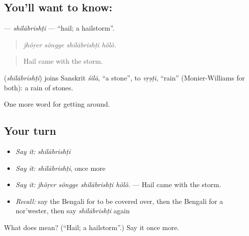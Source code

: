 \subsection*{You'll want to know: }
\textbf{} — \emph{shilābrishṭi} — \textquotedblleft{}hail; a hailstorm\textquotedblright{}.

\begin{quote}
   
\end{quote}

\begin{quote}
\emph{jhôṛer sôngge shilābrishṭi hôlô.}
\end{quote}

\begin{quote}
Hail came with the storm.
\end{quote}

\begin{cousinweb}
\textbf{} (\emph{shilābrishṭi}) joins Sanskrit \emph{śilā}, \textquotedblleft{}a stone\textquotedblright{}, to \emph{vṛṣṭi}, \textquotedblleft{}rain\textquotedblright{} (Monier-Williams for both): a rain of stones.
\end{cousinweb}

\begin{grammarlens}[title={What you've built}]
One more word for getting around.
\end{grammarlens}

\subsection*{Your turn}
\begin{itemize}
\raggedright
  \item \emph{Say it:} \emph{shilābrishṭi}
  \item \emph{Say it:} \emph{shilābrishṭi}, once more
  \item \emph{Say it:} \emph{jhôṛer sôngge shilābrishṭi hôlô.} — Hail came with the storm.
  \item \emph{Recall:} say the Bengali for to be covered over, then the Bengali for a nor'wester, then say \emph{shilābrishṭi} again
\end{itemize}

\begin{tcolorbox}[breakable,colback=teal!4,colframe=teal!35!black,title={Before you move on}]
What does  mean? (\textquotedblleft{}Hail; a hailstorm\textquotedblright{}.) Say it once more.
\end{tcolorbox}
